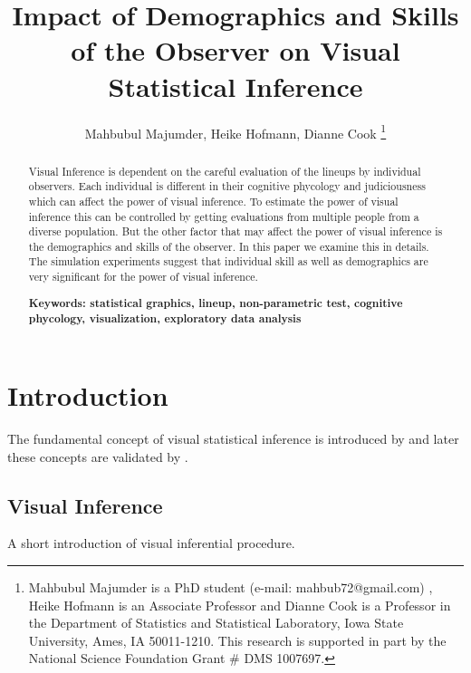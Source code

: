 \documentclass[10pt]{article}
\begin{document}
\title{Impact of Demographics and Skills of the Observer on Visual Statistical Inference }
\author{{Mahbubul Majumder, Heike Hofmann, Dianne Cook}
\thanks{Mahbubul Majumder is a PhD student (e-mail: mahbub72@gmail.com) , Heike Hofmann is an Associate  Professor and Dianne Cook is a Professor in the Department of Statistics and Statistical Laboratory, Iowa State University, Ames, IA 50011-1210. This research is supported in part by the National Science Foundation Grant \# DMS 1007697.}}
\date{\vspace{-.5in}}
\maketitle

\begin {abstract}  
Visual Inference is dependent on the careful evaluation of the lineups by individual observers. Each individual is different in their cognitive phycology and judiciousness which can affect the power of visual inference. To estimate the power of visual inference this can be controlled by getting evaluations from multiple people from a diverse population. But the other factor that may affect the power of visual inference is the demographics and skills of the observer. In this paper we examine this in details. The simulation experiments suggest that individual skill as well as demographics are very significant for the power of visual inference.

{\bf Keywords: \sf statistical graphics, lineup, non-parametric test, cognitive phycology, visualization, exploratory data analysis} 
\end {abstract}


\section{Introduction} 

The fundamental concept of visual statistical inference is introduced by \citet{buja:2009} and later these concepts are validated by \citet{majumder:2012}.

\subsection{Visual Inference} A short introduction of visual inferential procedure.
\end{document}
